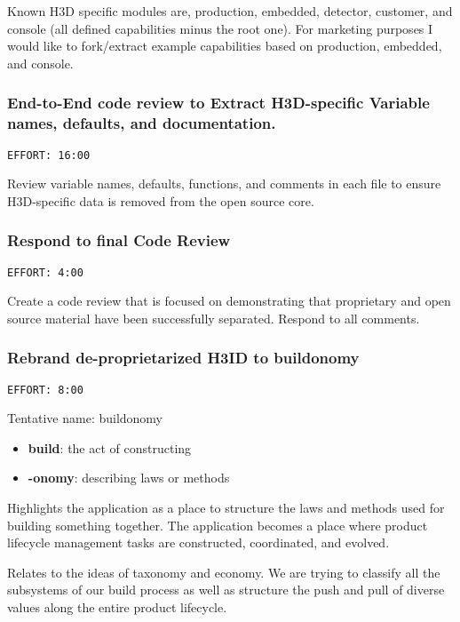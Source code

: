 \documentclass[11pt]{article}
\begin{document}
Known H3D specific modules are, production, embedded, detector, customer, and console (all defined
capabilities minus the root one). For marketing purposes I would like to fork/extract example
capabilities based on production, embedded, and console.

\subsubsection{End-to-End code review to Extract H3D-specific Variable names, defaults, and documentation.}
\label{sec:orgedffd91}
\begin{verbatim}
EFFORT: 16:00
\end{verbatim}

Review variable names, defaults, functions, and comments in each file to ensure H3D-specific data is
removed from the open source core.

\subsubsection{Respond to final Code Review}
\label{sec:orgcdaeaef}
\begin{verbatim}
EFFORT: 4:00
\end{verbatim}

Create a code review that is focused on demonstrating that proprietary and open source material have
been successfully separated. Respond to all comments.

\subsubsection{Rebrand de-proprietarized H3ID to buildonomy}
\label{sec:orge58e60d}
\begin{verbatim}
EFFORT: 8:00
\end{verbatim}

Tentative name: buildonomy

\begin{itemize}
\item \textbf{build}: the act of constructing
\item \textbf{-onomy}: describing laws or methods
\end{itemize}

Highlights the application as a place to structure the laws and methods used for building something
together. The application becomes a place where product lifecycle management tasks are constructed,
coordinated, and evolved.

Relates to the ideas of taxonomy and economy. We are trying to classify all the subsystems of our
build process as well as structure the push and pull of diverse values along the entire product
lifecycle.
\end{document}
